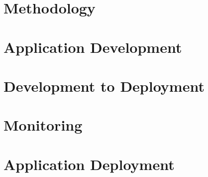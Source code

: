 \documentclass[10pt,a4paper,bibliography=totoc]{scrbook}
\begin{document}

\part{Methodology}  


\part{Application Development}
	




\part{Development to Deployment}
	



\part{Monitoring}


\part{Application Deployment}


\end{document}
